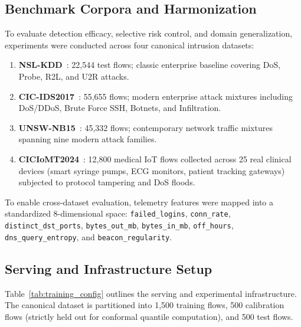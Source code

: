 \documentclass{ieeeaccess}
\begin{document}
\subsection{Benchmark Corpora and Harmonization}
To evaluate detection efficacy, selective risk control, and domain generalization, experiments were conducted across four canonical intrusion datasets:
\begin{enumerate}
    \item \textbf{NSL-KDD}~\cite{tavallaee2009detailed}: 22,544 test flows; classic enterprise baseline covering DoS, Probe, R2L, and U2R attacks.
    \item \textbf{CIC-IDS2017}~\cite{sharafaldin2018toward}: 55,655 flows; modern enterprise attack mixtures including DoS/DDoS, Brute Force SSH, Botnets, and Infiltration.
    \item \textbf{UNSW-NB15}~\cite{moustafa2015unsw}: 45,332 flows; contemporary network traffic mixtures spanning nine modern attack families.
    \item \textbf{CICIoMT2024}~\cite{dadkhah2024ciciomt2024}: 12,800 medical IoT flows collected across 25 real clinical devices (smart syringe pumps, ECG monitors, patient tracking gateways) subjected to protocol tampering and DoS floods.
\end{enumerate}

To enable cross-dataset evaluation, telemetry features were mapped into a standardized 8-dimensional space: \texttt{failed\_logins}, \texttt{conn\_rate}, \texttt{distinct\_dst\_ports}, \texttt{bytes\_out\_mb}, \texttt{bytes\_in\_mb}, \texttt{off\_hours}, \texttt{dns\_query\_entropy}, and \texttt{beacon\_regularity}.

\subsection{Serving and Infrastructure Setup}
Table~\ref{tab:training_config} outlines the serving and experimental infrastructure. The canonical dataset is partitioned into 1,500 training flows, 500 calibration flows (strictly held out for conformal quantile computation), and 500 test flows.
\end{document}
